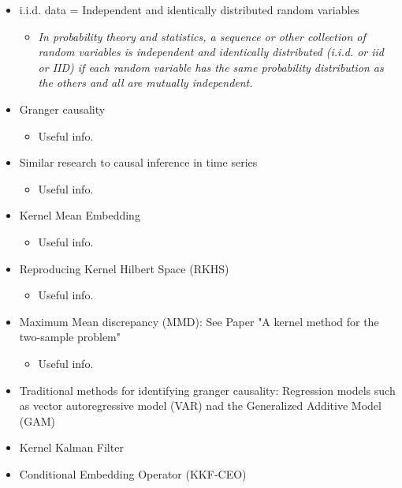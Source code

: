 \documentclass[a4paper]{article}
\begin{document}
\begin{itemize}

	\item i.i.d. data = Independent and identically distributed random variables
		\begin{itemize}
			\item \textit{In probability theory and statistics, a sequence or other collection of random variables is independent and identically distributed (i.i.d. or iid or IID) if each random variable has the same probability distribution as the others and all are mutually independent.}
		\end{itemize}

	\item Granger causality
		\begin{itemize}
			\item Useful info.	
		\end{itemize}			
	
	
	\item Similar research to causal inference in time series
		\begin{itemize}
			\item Useful info.	
		\end{itemize}			
	
	
	\item Kernel Mean Embedding
		\begin{itemize}
			\item Useful info.	
		\end{itemize}			
	
	
	
	\item Reproducing Kernel Hilbert Space (RKHS)
		\begin{itemize}
			\item Useful info.	
		\end{itemize}			
	
	
	
	\item Maximum Mean discrepancy (MMD): See Paper "A kernel method for the two-sample problem"
		\begin{itemize}
			\item Useful info.	
		\end{itemize}			
	
	
	\item Traditional methods for identifying granger causality: Regression models such as vector autoregressive model (VAR) nad the Generalized Additive Model (GAM)
	\item Kernel Kalman Filter
	\item Conditional Embedding Operator (KKF-CEO)
\end{itemize}
\end{document}
